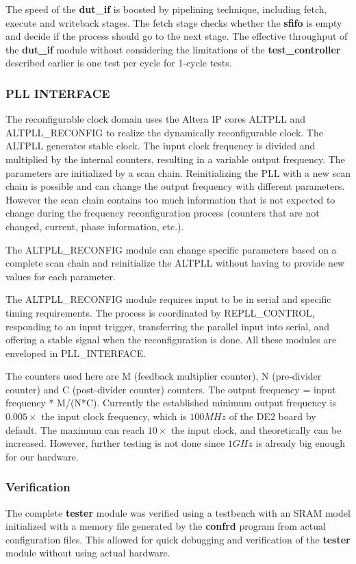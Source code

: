 The speed of the \textbf{dut\_if} is boosted by pipelining technique, including fetch, execute and writeback stages. The fetch stage checks whether the \textbf{sfifo} is empty and decide if the process should go to the next stage. 
The effective throughput of the \textbf{dut\_if} module without considering the limitations of the \textbf{test\_controller} described earlier is one test per cycle for 1-cycle tests.

\subsubsection{PLL INTERFACE}
The reconfigurable clock domain uses the Altera IP cores ALTPLL and
\\
ALTPLL\_RECONFIG to realize the dynamically reconfigurable clock.
The ALTPLL generates stable clock. The input clock frequency is divided and multiplied by the internal counters,
resulting in a variable output frequency. The parameters are initialized by a scan chain.
Reinitializing the PLL with a new scan chain is possible and can change the output frequency with different parameters.
However the scan chain contains too much information that is not expected to change during the frequency reconfiguration process
(counters that are not changed, current, phase information, etc.).

The ALTPLL\_RECONFIG module can change specific parameters based on a complete scan chain and reinitialize the ALTPLL without having to provide new values for each parameter.

The ALTPLL\_RECONFIG module requires input to be in serial and specific timing requirements. The process is coordinated by REPLL\_CONTROL, responding to an input trigger, transferring the parallel input into serial, and offering a stable signal when the reconfiguration is done. All these modules are enveloped in PLL\_INTERFACE.

The counters used here are M (feedback multiplier counter), N (pre-divider counter) and C (post-divider counter) counters. The output frequency = input frequency * M/(N*C). Currently the established minimum output frequency is $0.005\times$ the input clock frequency, which is $100MHz$ of the DE2 board by default. The maximum can reach $10\times$ the input clock, and theoretically can be increased. However, further testing is not done since $1GHz$ is already big enough for our hardware.


\subsubsection{Verification}
The complete \textbf{tester} module was verified using a testbench with an SRAM model initialized
with a memory file generated by the \textbf{confrd} program from actual configuration files. This allowed
for quick debugging and verification of the \textbf{tester} module without using actual hardware.


